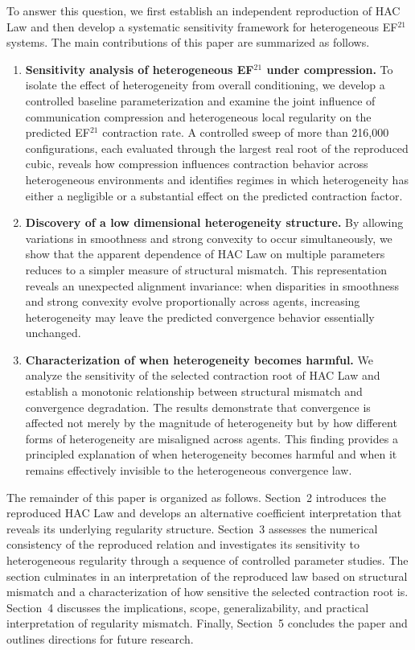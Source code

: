 \documentclass[mathematics,article,submit,moreauthors]{Definitions/mdpi}
\begin{document}
To answer this question, we first establish an independent reproduction
of HAC Law and then develop a systematic sensitivity framework for
heterogeneous EF$^{21}$ systems. The main contributions of this paper are summarized as follows. 

\begin{enumerate}
\addtolength{\labelwidth}{3pt}
\item \textbf{Sensitivity analysis of heterogeneous EF$^{21}$ under compression.}
To isolate the effect of heterogeneity from overall conditioning, we develop a controlled baseline parameterization and examine the joint influence of communication compression and heterogeneous local regularity on the predicted EF$^{21}$ contraction rate. A controlled sweep of more than 216,000 configurations, each evaluated through the largest real root of the reproduced cubic, reveals how compression influences contraction behavior across heterogeneous environments and identifies regimes in which heterogeneity has either a negligible or a substantial effect on the predicted contraction factor.
\item \textbf{Discovery of a low dimensional heterogeneity structure.} By allowing variations in smoothness and strong convexity to occur simultaneously, we show that the apparent dependence of HAC Law on multiple parameters reduces to a simpler measure of structural mismatch. This representation reveals an unexpected alignment invariance: when disparities in smoothness and strong convexity evolve proportionally across agents, increasing heterogeneity may leave the predicted convergence behavior essentially unchanged. 
\item \textbf{Characterization of when heterogeneity becomes harmful.} We analyze the sensitivity of the selected contraction root of HAC Law and establish a monotonic relationship between structural mismatch and convergence degradation. The results demonstrate that convergence is affected not merely by the magnitude of heterogeneity but by how different forms of heterogeneity are misaligned across agents. This finding provides a principled explanation of when heterogeneity becomes harmful and when it remains effectively invisible to the heterogeneous convergence law. \end{enumerate}

The remainder of this paper is organized as follows. Section~2 introduces the reproduced HAC Law and develops an alternative coefficient interpretation that reveals its underlying regularity structure. Section~3 assesses the numerical consistency of the reproduced relation and investigates its sensitivity to heterogeneous regularity through a sequence of controlled parameter studies. The section culminates in an interpretation of the reproduced law based on structural mismatch and a characterization of how sensitive the selected contraction root is. Section~4 discusses the implications, scope, generalizability, and practical interpretation of regularity mismatch. Finally, Section~5 concludes the paper and outlines directions for future research.
\end{document}
